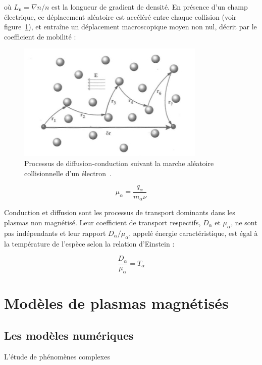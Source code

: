\begin{refsection}
où $L_\text{n}=\nabla n/n$ est la longueur de gradient de densité. 
En présence d'un champ électrique, ce déplacement aléatoire est accéléré entre
chaque collision (voir figure~\ref{1-collisions}), et entraîne un déplacement
macroscopique moyen non nul, décrit par le coefficient de mobilité :
\begin{figure}
\centering
\includegraphics[width=0.8\textwidth]{figures/collisions.jpg}
{\caption{Processus de diffusion-conduction suivant la marche aléatoire
collisionnelle d'un électron~{\cite{Rax}}.}\label{1-collisions}}
\end{figure}
\begin{equation}
    \mu_\alpha=\frac{q_\alpha}{m_\alpha\nu}
\end{equation}
 
Conduction et diffusion sont les processus de transport dominants dans les
plasmas non magnétisé. Leur coefficient de transport respectifs, $D_\alpha$ et
$\mu_\alpha$, ne sont pas indépendants et leur rapport $D_\alpha/\mu_\alpha$,
appelé énergie caractéristique, est égal à la température de l'espèce selon la relation
d'Einstein :
 
\begin{equation}
    \frac{D_\alpha}{\mu_\alpha}=T_\alpha
\end{equation}
 
\section{Modèles de plasmas magnétisés}
\subsection{Les modèles numériques}
L'étude de phénomènes complexes
%


\end{refsection}
